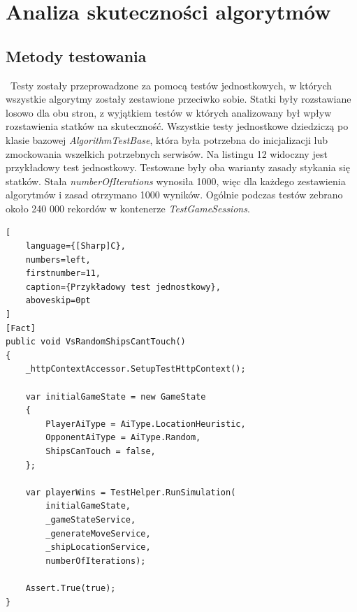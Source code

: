 \newpage %
\section{Analiza skuteczności algorytmów}

\subsection{Metody testowania}
\indent\ Testy zostały przeprowadzone za pomocą testów jednostkowych, w których wszystkie algorytmy zostały zestawione przeciwko sobie. Statki były rozstawiane losowo dla obu stron, z wyjątkiem testów w których analizowany był wpływ rozstawienia statków na skuteczność. Wszystkie testy jednostkowe dziedziczą po klasie bazowej \emph{AlgorithmTestBase}, która była potrzebna do inicjalizacji lub zmockowania wszelkich potrzebnych serwisów. Na listingu 12 widoczny jest przykładowy test jednostkowy. Testowane były oba warianty zasady stykania się statków. Stała \emph{numberOfIterations} wynosiła 1000, więc dla każdego zestawienia algorytmów i zasad otrzymano 1000 wyników. Ogólnie podczas testów zebrano około 240 000 rekordów w kontenerze \emph{TestGameSessions}.

\begin{addmargin}[10mm]{0mm}
\begin{lstlisting}[
    language={[Sharp]C},
    numbers=left,
    firstnumber=11,
    caption={Przykładowy test jednostkowy},
    aboveskip=0pt
]
[Fact]
public void VsRandomShipsCantTouch()
{
    _httpContextAccessor.SetupTestHttpContext();

    var initialGameState = new GameState
    {
        PlayerAiType = AiType.LocationHeuristic,
        OpponentAiType = AiType.Random,
        ShipsCanTouch = false,
    };

    var playerWins = TestHelper.RunSimulation(
        initialGameState,
        _gameStateService,
        _generateMoveService,
        _shipLocationService,
        numberOfIterations);

    Assert.True(true);
}
\end{lstlisting}
\end{addmargin}


